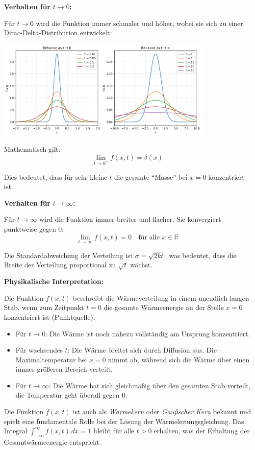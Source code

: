 \documentclass{article}
\begin{document}
\textbf{Verhalten für $t \to 0$:}

Für $t \to 0$ wird die Funktion immer schmaler und höher, wobei sie sich zu einer Dirac-Delta-Distribution entwickelt:

\begin{center}
\includegraphics[width=0.8\textwidth]{heat_kernel_limits.png}
\end{center}

Mathematisch gilt:
$$\lim_{t \to 0^+} f(x,t) = \delta(x)$$

Dies bedeutet, dass für sehr kleine $t$ die gesamte ``Masse'' bei $x=0$ konzentriert ist.

\textbf{Verhalten für $t \to \infty$:}

Für $t \to \infty$ wird die Funktion immer breiter und flacher. Sie konvergiert punktweise gegen 0:
$$\lim_{t \to \infty} f(x,t) = 0 \quad \text{für alle } x \in \mathbb{R}$$

Die Standardabweichung der Verteilung ist $\sigma = \sqrt{2kt}$, was bedeutet, dass die Breite der Verteilung proportional zu $\sqrt{t}$ wächst.

\textbf{Physikalische Interpretation:}

Die Funktion $f(x,t)$ beschreibt die Wärmeverteilung in einem unendlich langen Stab, wenn zum Zeitpunkt $t=0$ die gesamte Wärmeenergie an der Stelle $x=0$ konzentriert ist (Punktquelle).

\begin{itemize}
\item Für $t \to 0$: Die Wärme ist noch nahezu vollständig am Ursprung konzentriert.
\item Für wachsendes $t$: Die Wärme breitet sich durch Diffusion aus. Die Maximaltemperatur bei $x=0$ nimmt ab, während sich die Wärme über einen immer größeren Bereich verteilt.
\item Für $t \to \infty$: Die Wärme hat sich gleichmäßig über den gesamten Stab verteilt, die Temperatur geht überall gegen 0.
\end{itemize}

Die Funktion $f(x,t)$ ist auch als \textit{Wärmekern} oder \textit{Gaußscher Kern} bekannt und spielt eine fundamentale Rolle bei der Lösung der Wärmeleitungsgleichung. Das Integral $\int_{-\infty}^{\infty} f(x,t) \, dx = 1$ bleibt für alle $t > 0$ erhalten, was der Erhaltung der Gesamtwärmeenergie entspricht.
\end{document}
